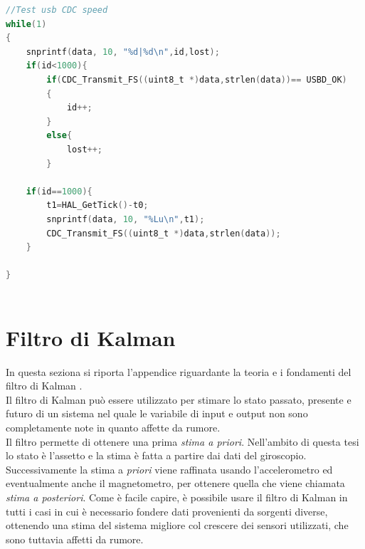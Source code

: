 \begin{lstlisting}[language=C]
 //Test usb CDC speed
while(1)
{
	snprintf(data, 10, "%d|%d\n",id,lost);
	if(id<1000){
		if(CDC_Transmit_FS((uint8_t *)data,strlen(data))== USBD_OK)
		{
			id++;
		}
		else{
			lost++;
		}

	if(id==1000){
		t1=HAL_GetTick()-t0;
		snprintf(data, 10, "%Lu\n",t1);
		CDC_Transmit_FS((uint8_t *)data,strlen(data));
	}
	
}



\end{lstlisting}


\chapter{Filtro di Kalman}
\label{appendixKalman}
In questa seziona si riporta l'appendice riguardante la teoria e i fondamenti del filtro di Kalman \cite{trackingThesis}.\\
Il filtro di Kalman può essere utilizzato per stimare lo stato passato, presente e futuro di un sistema nel quale le variabile di input e output non sono completamente note in quanto affette da rumore.\\
Il filtro permette di ottenere una prima \textit{stima a priori}. Nell'ambito di questa tesi lo stato è l'assetto e la stima è fatta a partire dai dati del giroscopio. Successivamente la stima a \textit{priori} viene raffinata usando l'accelerometro ed eventualmente anche il magnetometro, per ottenere quella che viene chiamata \textit{stima a posteriori}.
Come è facile capire, è possibile usare il filtro di Kalman in tutti i casi in cui è necessario fondere dati provenienti da sorgenti diverse, ottenendo una stima del sistema migliore col crescere dei sensori utilizzati, che sono tuttavia affetti da rumore.

